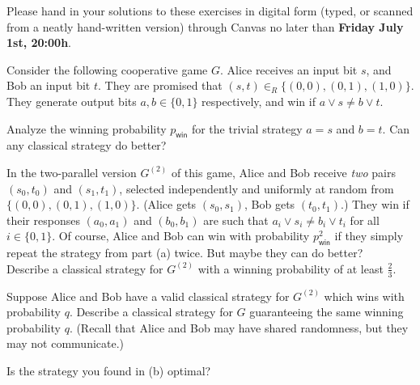 \documentclass[a4paper,10pt,landscape,twocolumn]{scrartcl}
\newcommand\deadline{Friday July 1st, 20:00h}
\begin{document}
\newcommand{\Hmin}{\mathrm{H}_{\mathrm{min}}}

\homeworkproblems

{\sffamily\noindent
Please hand in your solutions to these exercises in digital form (typed, or scanned from a neatly hand-written version) through Canvas no later than \textbf{\deadline}.  %
}

\begin{exercise}
	Consider the following cooperative game $G$. Alice receives an input bit $s$, and Bob an input bit $t$. They are promised that $(s,t) \in_R \{(0,0),(0,1),(1,0)\}$. They generate output bits $a,b \in \{0,1\}$ respectively, and win if $a \vee s \neq b \vee t$.
	\begin{subex}
		Analyze the winning probability $p_{\mathsf{win}}$ for the trivial strategy $a = s$ and $b = t$. Can any classical strategy do better?
	\end{subex}
    \begin{subex}
    	In the two-parallel version $G^{(2)}$ of this game, Alice and Bob receive \emph{two} pairs $(s_0, t_0)$ and $(s_1, t_1)$, selected independently and uniformly at random from $\{(0,0),(0,1),(1,0)\}$. (Alice gets $(s_0, s_1)$, Bob gets $(t_0, t_1)$.) They win if their responses $(a_0, a_1)$ and $(b_0, b_1)$ are such that $a_i \vee s_i \neq b_i \vee t_i$ for all $i \in \{0,1\}$. Of course, Alice and Bob can win with probability $p_{\mathsf{win}}^2$ if they simply repeat the strategy from part (a) twice. But maybe they can do better?
    	\\
    	Describe a classical strategy for $G^{(2)}$ with a winning probability of at least $\frac{2}{3}$.
    \end{subex}
    \begin{subex}
    	Suppose Alice and Bob have a valid classical strategy for $G^{(2)}$ which wins with probability $q$. Describe a classical strategy for $G$ guaranteeing the same winning probability $q$. (Recall that Alice and Bob may have shared randomness, but they may not communicate.)
    \end{subex}
    \begin{subex}
    Is the strategy you found in (b) optimal?
    \end{subex}
\end{exercise}
\end{document}
